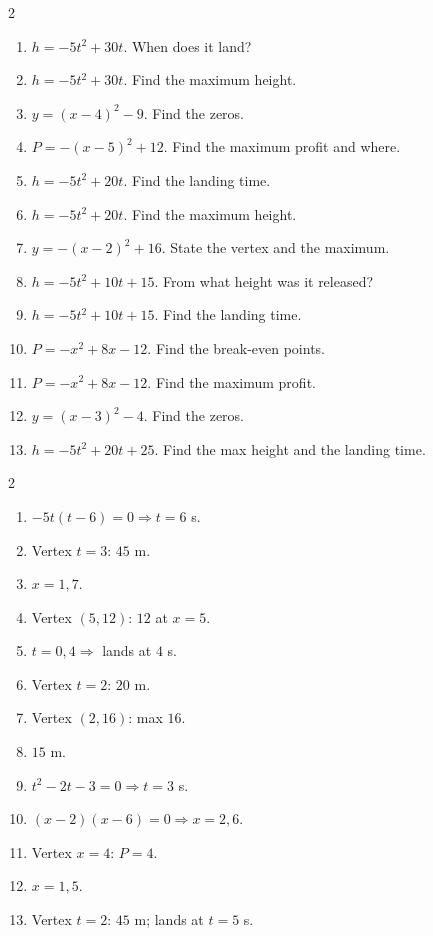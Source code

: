 \documentclass[11pt]{article}
\begin{document}
\begin{recapbox}
\begin{multicols}{2}
\small
\begin{enumerate}[leftmargin=*,itemsep=3pt]
  \item $h=-5t^2+30t$. When does it land?
  \item $h=-5t^2+30t$. Find the maximum height.
  \item $y=(x-4)^2-9$. Find the zeros.
  \item $P=-(x-5)^2+12$. Find the maximum profit and where.
  \item $h=-5t^2+20t$. Find the landing time.
  \item $h=-5t^2+20t$. Find the maximum height.
  \item $y=-(x-2)^2+16$. State the vertex and the maximum.
  \item $h=-5t^2+10t+15$. From what height was it released?
  \item $h=-5t^2+10t+15$. Find the landing time.
  \item $P=-x^2+8x-12$. Find the break-even points.
  \item $P=-x^2+8x-12$. Find the maximum profit.
  \item $y=(x-3)^2-4$. Find the zeros.
  \item $h=-5t^2+20t+25$. Find the max height and the landing time.
\end{enumerate}
\end{multicols}
\end{recapbox}

\begin{keybox}
\begin{multicols}{2}
\small
\begin{enumerate}[leftmargin=*,itemsep=3pt]
  \item $-5t(t-6)=0\Rightarrow t=6$ s.
  \item Vertex $t=3$: $45$ m.
  \item $x=1,7$.
  \item Vertex $(5,12)$: $12$ at $x=5$.
  \item $t=0,4\Rightarrow$ lands at $4$ s.
  \item Vertex $t=2$: $20$ m.
  \item Vertex $(2,16)$: max $16$.
  \item $15$ m.
  \item $t^2-2t-3=0\Rightarrow t=3$ s.
  \item $(x-2)(x-6)=0\Rightarrow x=2,6$.
  \item Vertex $x=4$: $P=4$.
  \item $x=1,5$.
  \item Vertex $t=2$: $45$ m; lands at $t=5$ s.
\end{enumerate}
\end{multicols}
\end{keybox}
\end{document}
